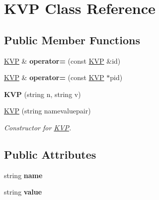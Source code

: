 \hypertarget{classKVP}{
\section{KVP Class Reference}
\label{classKVP}
}
\subsection*{Public Member Functions}
\begin{DoxyCompactItemize}
\item 
\hypertarget{classKVP_a2ec7fe8668a701defe0791c753c68a25}{
\hyperlink{classKVP}{KVP} \& {\bfseries operator=} (const \hyperlink{classKVP}{KVP} \&id)}
\label{classKVP_a2ec7fe8668a701defe0791c753c68a25}

\item 
\hypertarget{classKVP_ada2383a53ee54e47576d9487891e7a88}{
\hyperlink{classKVP}{KVP} \& {\bfseries operator=} (const \hyperlink{classKVP}{KVP} $\ast$pid)}
\label{classKVP_ada2383a53ee54e47576d9487891e7a88}

\item 
\hypertarget{classKVP_a1b5f74b36968db8602ac001040f9faa4}{
{\bfseries KVP} (string n, string v)}
\label{classKVP_a1b5f74b36968db8602ac001040f9faa4}

\item 
\hyperlink{classKVP_a2b7de3a265f04ab40c0ba73b72cb4de4}{KVP} (string namevaluepair)
\begin{DoxyCompactList}\small\item\em Constructor for \hyperlink{classKVP}{KVP}. \end{DoxyCompactList}\end{DoxyCompactItemize}
\subsection*{Public Attributes}
\begin{DoxyCompactItemize}
\item 
\hypertarget{classKVP_ac95b4cb75a07f639baa8b58f93dbcecf}{
string {\bfseries name}}
\label{classKVP_ac95b4cb75a07f639baa8b58f93dbcecf}

\item 
\hypertarget{classKVP_a43bbe2a101f930e2dafc8542629194a4}{
string {\bfseries value}}
\label{classKVP_a43bbe2a101f930e2dafc8542629194a4}

\end{DoxyCompactItemize}



